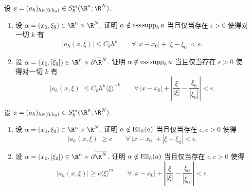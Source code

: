 \begin{exer}[半经典本质支集]\label{ex:6.20}
设 $a = (a_h)_{h \in (0,h_0)} \in S^m_{\hbar}(\R^n; \R^N)$.
\begin{enumerate}
    \item 设 $\alpha = (x_0, \xi_0) \in \R^n \times \R^N$. 证明 $\alpha \notin \operatorname{ess\,supp}_{\hbar} a$ 当且仅当存在 $\epsilon > 0$ 使得对一切 $k$ 有
    \begin{equation}\label{eq:6.135}
        |a_h(x, \xi)| \le C_k h^k \qquad \forall\, |x - x_0| + |\xi - \xi_0| < \epsilon.
    \end{equation}
    \item 设 $\alpha = (x_0, [\xi_0]) \in \R^n \times \partial\overline{\R^N}$. 证明 $\alpha \notin \operatorname{ess\,supp}_{\hbar} a$ 当且仅当存在 $\epsilon > 0$ 使得对一切 $k$ 有
    \begin{equation}\label{eq:6.136}
        |a_h(x, \xi)| \le C_k h^k \langle \xi \rangle^{-k} \qquad \forall\, |x - x_0| + \left| \frac{\xi}{|\xi|} - \frac{\xi_0}{|\xi_0|} \right| < \epsilon.
    \end{equation}
\end{enumerate}
\end{exer}

\begin{exer}[半经典椭圆集]\label{ex:6.21}
设 $a = (a_h)_{h \in (0,h_0)} \in S^m_{\hbar}(\R^n; \R^N)$.
\begin{enumerate}
    \item 设 $\alpha = (x_0, \xi_0) \in \R^n \times \R^N$. 证明 $\alpha \notin \operatorname{Ell}_{\hbar}(a)$ 当且仅当存在 $\epsilon, c > 0$ 使得
    \begin{equation}\label{eq:6.137}
        |a_h(x, \xi)| \ge c \qquad \forall\, |x - x_0| + |\xi - \xi_0| < \epsilon.
    \end{equation}
    \item 设 $\alpha = (x_0, [\xi_0]) \in \R^n \times \partial\overline{\R^N}$. 证明 $\alpha \notin \operatorname{Ell}_{\hbar}(a)$ 当且仅当存在 $\epsilon, c > 0$ 使得
    \begin{equation}\label{eq:6.138}
        |a_h(x, \xi)| \ge c \langle \xi \rangle^m \qquad \forall\, |x - x_0| + \left| \frac{\xi}{|\xi|} - \frac{\xi_0}{|\xi_0|} \right| < \epsilon.
    \end{equation}
\end{enumerate}
\end{exer}

